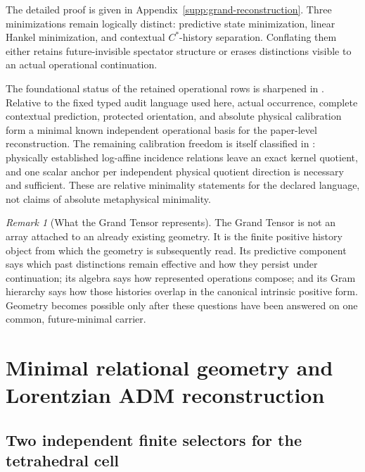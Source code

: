 \documentclass[11pt]{article}
\theoremstyle{definition}
\theoremstyle{remark}
\newtheorem{remark}[remark]{Remark}
\begin{document}
The detailed proof is given in Appendix~\ref{supp:grand-reconstruction}.  Three minimizations
remain logically distinct: predictive state minimization, linear Hankel
minimization, and contextual $C^*$-history separation.  Conflating them either
retains future-invisible spectator structure or erases distinctions visible to
an actual operational continuation.

The foundational status of the retained operational rows is sharpened in
.  Relative to the fixed typed audit
language used here, actual occurrence, complete contextual prediction,
protected orientation, and absolute physical calibration form a minimal known
independent operational basis for the paper-level reconstruction.  The
remaining calibration freedom is itself classified in
: physically established log-affine incidence
relations leave an exact kernel quotient, and one scalar anchor per independent
physical quotient direction is necessary and sufficient.  These are relative
minimality statements for the declared language, not claims of absolute
metaphysical minimality.

\begin{remark}[What the Grand Tensor represents]
The Grand Tensor is not an array attached to an already existing geometry.  It is the finite positive history object from
which the geometry is subsequently read.  Its predictive component says which
past distinctions remain effective and how they persist under continuation;
its algebra says how represented operations compose; and its Gram hierarchy
says how those histories overlap in the canonical intrinsic positive form.
Geometry becomes possible only after these questions have been answered on one
common, future-minimal carrier.
\end{remark}

\section{Minimal relational geometry and Lorentzian ADM reconstruction}
\label{sec:adm-main}

\subsection{Two independent finite selectors for the tetrahedral cell}
\end{document}
